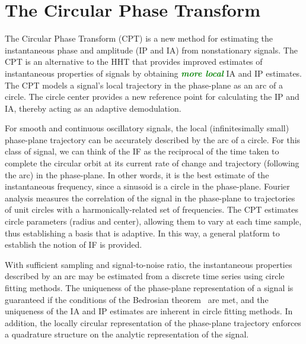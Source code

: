 \documentclass[journal,11pt,a4paper,onecolumn,draftcls]{IEEEtran}
\newcommand{\dean}[1]{\textsf{\emph{\textbf{\textcolor{green}{#1}}}}}
\begin{document}
\section{The Circular Phase Transform}\label{sect:CPTDescriptionSection}
The Circular Phase Transform (CPT) is a new method for estimating the instantaneous phase and amplitude (IP and IA) from nonstationary signals. The CPT is an alternative to the HHT that provides improved estimates of instantaneous properties of signals by obtaining \dean{more local} IA and IP estimates. The CPT models a signal's local trajectory in the phase-plane as an arc of a circle. The circle center provides a new reference point for calculating the IP and IA, thereby acting as an adaptive demodulation.

For smooth and continuous oscillatory signals, the local (infinitesimally small) phase-plane trajectory can be accurately described by the arc of a circle. For this class of signal, we can think of the IF as the reciprocal of the time taken to complete the circular orbit at its current rate of change and trajectory (following the arc) in the phase-plane. In other words, it is the best estimate of the instantaneous frequency, since a sinusoid is a circle in the phase-plane. Fourier analysis measures the correlation of the signal in the phase-plane to trajectories of unit circles with a harmonically-related set of frequencies. The CPT estimates circle parameters (radius and center), allowing them to vary at each time sample, thus establishing a basis that is adaptive. In this way, a general platform to establish the notion of IF is provided.

With sufficient sampling and signal-to-noise ratio, the instantaneous properties described by an arc may be estimated from a discrete time series using circle fitting methods. The uniqueness of the phase-plane representation of a signal is guaranteed if the conditions of the Bedrosian theorem~\cite{Bedrosian1963} are met, and the uniqueness of the IA and IP estimates are inherent in circle fitting methods. In addition, the locally circular representation of the phase-plane trajectory enforces a quadrature structure on the analytic representation of the signal.
\end{document}
